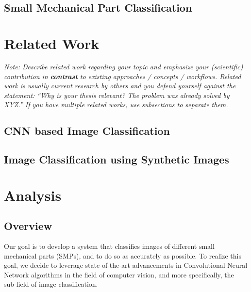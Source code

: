 \documentclass[a4paper,12pt,twoside]{report}
\begin{document}
\section{Small Mechanical Part Classification}



\chapter{Related Work}

\textit{Note: Describe related work regarding your topic and emphasize your (scientific) contribution in \textbf{contrast} to existing approaches / concepts / workflows. Related work is usually current research by others and you defend yourself against the statement: ``Why is your thesis relevant? The problem was already solved by XYZ.'' If you have multiple related works, use subsections to separate them.}

\section{CNN based Image Classification}
\section{Image Classification using Synthetic Images}



\chapter{Analysis}


\section{Overview}

Our goal is to develop a system that classifies images of different small mechanical parts (SMPs), and to do so as accurately as possible. To realize this goal, we decide to leverage state-of-the-art advancements in Convolutional Neural Network algorithms in the field of computer vision, and more specifically, the sub-field of image classification.
\end{document}
